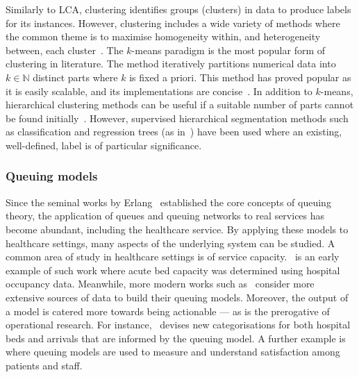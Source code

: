Similarly to LCA, clustering identifies groups (clusters) in data to produce
labels for its instances. However, clustering includes a wide variety of methods
where the common theme is to maximise homogeneity within, and heterogeneity
between, each cluster~\cite{Everitt2011}. The \(k\)-means paradigm is the most
popular form of clustering in literature. The method iteratively partitions
numerical data into \(k \in \mathbb N\) distinct parts where \(k\) is fixed a
priori. This method has proved popular as it is easily scalable, and its
implementations are concise~\cite{Olafsson2008,Wu2009}. In addition to
\(k\)-means, hierarchical clustering methods can be useful if a suitable number
of parts cannot be found initially~\cite{Vuik2016a}. However, supervised
hierarchical segmentation methods such as classification and regression trees
(as in~\cite{Harper2006}) have been used where an existing, well-defined, label
is of particular significance.

\subsubsection{Queuing models}

Since the seminal works by Erlang~\cite{Erlang1917,Erlang1920} established the
core concepts of queuing theory, the application of queues and queuing networks
to real services has become abundant, including the healthcare service. By
applying these models to healthcare settings, many aspects of the underlying
system can be studied. A common area of study in healthcare settings is of
service capacity.~\cite{McClain1976} is an early example of such work where
acute bed capacity was determined using hospital occupancy data. Meanwhile, more
modern works such as~\cite{Palvannan2012,Pinto2014} consider more extensive
sources of data to build their queuing models.  Moreover, the output of a model
is catered more towards being actionable --- as is the prerogative of
operational research. For instance,~\cite{Pinto2014} devises new categorisations
for both hospital beds and arrivals that are informed by the queuing model. A
further example is~\cite{Komashie2015} where queuing models are used to measure
and understand satisfaction among patients and staff.

